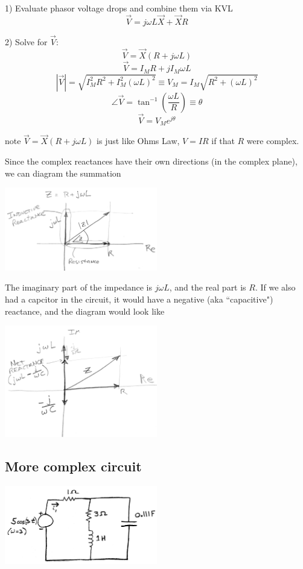1)
Evaluate phasor voltage drops and combine them via KVL
\[
\vec{V} = j\omega L \vec{X} + \vec{X} R
\]

2) Solve for $\vec{V}$:
\[
\vec{V} = \vec{X} (R+j\omega L)
\]
\[
\vec{V} = I_MR + jI_M \omega L
\]
\[
|\vec{V}| = \sqrt{I_M^2 R^2 + I_M^2(\omega L)^2} \equiv V_M = I_M\sqrt{R^2+(\omega L)^2}
\]
\[
\angle{\vec{V}} = \tan^{-1}(\frac {\omega L}  {R} ) \equiv \theta
\]
\[
\vec{V} = V_Me^{j\theta}
\]

note  $\vec{V} = \vec{X}(R+j\omega L) $ is just like Ohms Law, $V=IR$ if that $R$ were complex.

Since the complex reactances have their own directions (in the complex plane), we can diagram the summation


\includegraphics[width=0.5\textwidth]{figsChapt02/UI87197.png}

The imaginary part of the impedance is $j\omega L$, and the real part is $R$.
If we also had a capcitor in the circuit, it would have a negative (aka ``capacitive") reactance,
and the diagram would look like

\includegraphics[width=0.5\textwidth]{figsChapt02/HF41781.png}

\subsection{More complex circuit}

\includegraphics[width=0.5\textwidth]{figsChapt02/AM06622.png}


